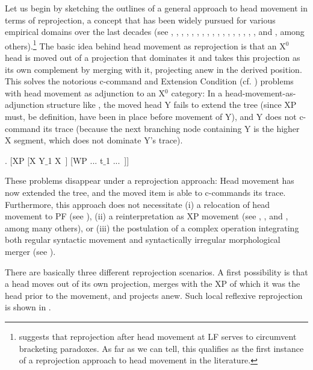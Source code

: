 \documentclass[output=paper
,modfonts
,nonflat]{langsci/langscibook}
\begin{document}
Let us begin by sketching the outlines of a general approach to head
movement in terms of reprojection, a concept that has been widely
pursued for various empirical domains over the last decades (see
\cite{Pesetsky:85}, \cite{Stechow&Sternefeld:88},
\cite{Sternefeld:89}, \cite{Holmberg:91}, \cite{Ackemaetal:93},
\cite{Kiss:95}, \cite{Koeneman:00}, \cite{Haider:00:bra},
\cite{Bhatt:02}, \cite{Hornstein&Uriagereka:02},
\cite{Fanselow:03,Fanselow:09:boo}, \cite{Bury:03}, \cite{Suranyi:05},
\cite{Donati:06}, \cite{Bayer&Brandner:08},
\cite{Georgi&Mueller:10:rep}, \cite{Mueller:11:loc}, and
, among others).\footnote{\cite{Pesetsky:85}
  suggests that reprojection after head movement at LF serves to
  circumvent bracketing paradoxes. As far as we can tell, this
  qualifies as the first instance of a reprojection approach to head
  movement in the literature.} The basic idea behind head movement as
reprojection is that an X$^0$ head is moved out of a projection that dominates it 
and takes this projection as its own complement by merging with it,
  projecting anew in the derived position. This solves the notorious
  c-command and Extension Condition (cf. \cite{Chomsky:95}) problems with head movement as
  adjunction to an X$^0$ category: In a head-movement-as-adjunction structure like \Next,
the moved head Y fails to extend the tree (since XP must, be
definition, have been in place before movement of Y), and Y does not
c-command its trace (because the next branching node containing Y is
the higher X segment, which does not dominate Y's trace).

\Lsciexi. [XP [X Y$\_$1 X~] [WP ... t$\_$1 ...~]]

These problems disappear under a reprojection approach:  Head movement has now extended the
  tree, and the moved item is able to c-commands its
  trace. Furthermore, this approach does not 
  necessitate (i) a relocation of head movement to PF (see
  \cite{Chomsky:00}), (ii) a
  reinterpretation as XP movement (see \cite{Koopman&Szabolcsi:00}, \cite{Mahajan:01},
  and \cite{Nilsen:03:diss}, among many others), or (iii) the
  postulation of a complex
  operation integrating both regular syntactic movement and
  syntactically irregular morphological merger (see
  \cite{Matushansky:06}). 

There are basically three different reprojection scenarios. A first
possibility is that a head moves out of its own projection, merges
with the XP of which it was the head prior to the movement, and
projects anew. Such local reflexive reprojection is shown in \Next. 
\end{document}
